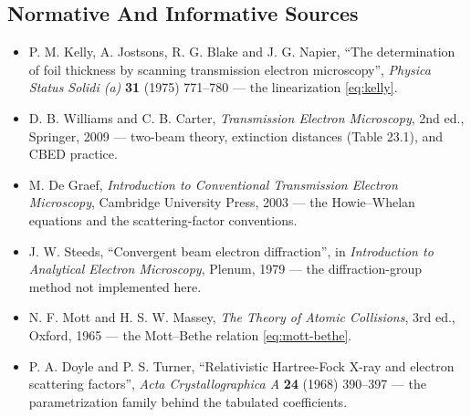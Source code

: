 \subsection{Normative And Informative Sources}

\begin{itemize}
  \item P. M. Kelly, A. Jostsons, R. G. Blake and J. G. Napier, ``The determination of foil
        thickness by scanning transmission electron microscopy'', \emph{Physica Status Solidi
        (a)} \textbf{31} (1975) 771--780 --- the linearization \eqref{eq:kelly}.
  \item D. B. Williams and C. B. Carter, \emph{Transmission Electron Microscopy}, 2nd ed.,
        Springer, 2009 --- two-beam theory, extinction distances (Table 23.1), and CBED
        practice.
  \item M. De Graef, \emph{Introduction to Conventional Transmission Electron Microscopy},
        Cambridge University Press, 2003 --- the Howie--Whelan equations and the
        scattering-factor conventions.
  \item J. W. Steeds, ``Convergent beam electron diffraction'', in \emph{Introduction to
        Analytical Electron Microscopy}, Plenum, 1979 --- the diffraction-group method not
        implemented here.
  \item N. F. Mott and H. S. W. Massey, \emph{The Theory of Atomic Collisions}, 3rd ed.,
        Oxford, 1965 --- the Mott--Bethe relation \eqref{eq:mott-bethe}.
  \item P. A. Doyle and P. S. Turner, ``Relativistic Hartree-Fock X-ray and electron
        scattering factors'', \emph{Acta Crystallographica A} \textbf{24} (1968) 390--397 ---
        the parametrization family behind the tabulated coefficients.
\end{itemize}
